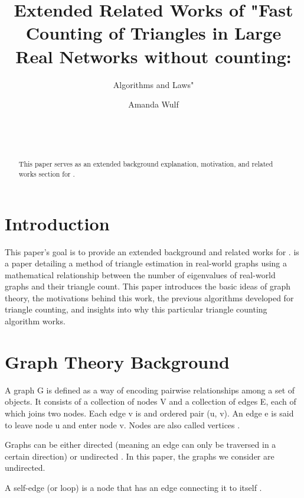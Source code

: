 \documentclass{acm_proc_article-sp}
\begin{document}
\title{Extended Related Works of "Fast Counting of Triangles in Large Real Networks without counting:}
\subtitle{Algorithms and Laws"}

\author{
\alignauthor
Amanda Wulf\\
       \\
       \\
       \\
}

\maketitle
\begin{abstract}
This paper serves as an extended background explanation, motivation, and related
works section for \cite{original}.
\end{abstract}

\section{Introduction}
This paper's goal is to provide an extended background and related works for
\cite{original}. \cite{original} is a paper detailing a method of triangle
estimation in real-world graphs using a mathematical relationship between the
number of eigenvalues of real-world graphs and their triangle count. This paper
introduces the basic ideas of graph theory, the motivations behind this work,
the previous algorithms developed for triangle counting, and insights into why
this particular triangle counting algorithm works.

\section{Graph Theory Background}
A graph G is defined as a way of encoding pairwise relationships among a set of
objects. It consists of a collection of nodes V and a collection of edges E, each
of which joins two nodes. Each edge v is and ordered pair (u, v). An edge e is
said to leave node u and enter node v. Nodes are also called vertices
\cite{kleinberg}.

Graphs can be either directed (meaning an edge can only be traversed in a
certain direction) or undirected \cite{kleinberg}. In this paper, the graphs we
consider are undirected.

A self-edge (or loop) is a node that has an edge connecting it to itself
\cite{diestel}.
\end{document}
